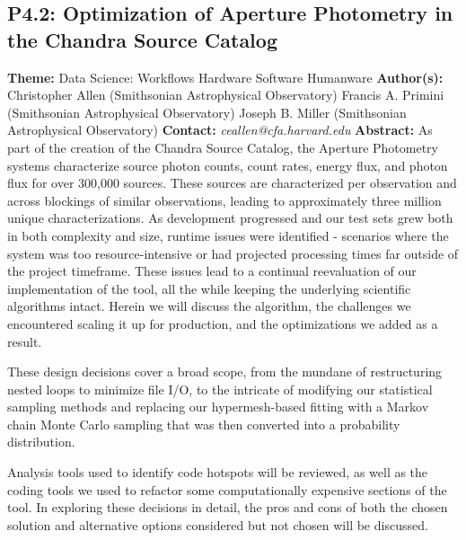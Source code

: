 \documentclass{report}
\begin{document}
{{{{{{\subsection*{P4.2: Optimization of Aperture Photometry in the Chandra Source Catalog}
{\bf Theme:}  Data Science: Workflows Hardware Software Humanware\newline
{\bf Author(s):}\newline
Christopher Allen (Smithsonian Astrophysical Observatory) \newline Francis A. Primini (Smithsonian Astrophysical Observatory) \newline  Joseph B. Miller (Smithsonian Astrophysical Observatory)\newline   \newline  \newline  \newline\newline
{\bf Contact:} {\it ceallen@cfa.harvard.edu}\newline
\newline\newline
{\bf Abstract:}\newline
As part of the creation of the Chandra Source Catalog, the Aperture Photometry systems characterize source photon counts, count rates, energy flux, and photon flux for over 300,000 sources.  These sources are characterized per observation and across blockings of similar observations, leading to approximately three million unique characterizations. As development progressed and our test sets grew both in both complexity and size, runtime issues were identified - scenarios where the system was too resource-intensive or had projected processing times far outside of the project timeframe.  These issues lead to a continual reevaluation of our implementation of the tool, all the while keeping the underlying scientific algorithms intact. Herein we will discuss the algorithm, the challenges we encountered scaling it up for production, and the optimizations we added as a result.
 
These design decisions cover a broad scope, from the mundane of restructuring nested loops to minimize file I/O, to the intricate of modifying our statistical sampling methods and replacing our hypermesh-based fitting with a Markov chain Monte Carlo sampling that was then converted into a probability distribution. 
 
Analysis tools used to identify code hotspots will be reviewed, as well as the coding tools we used to refactor some computationally expensive sections of the tool. In exploring these decisions in detail, the pros and cons of both the chosen solution and alternative options considered but not chosen will be discussed.
 
}}}}}}
\end{document}
